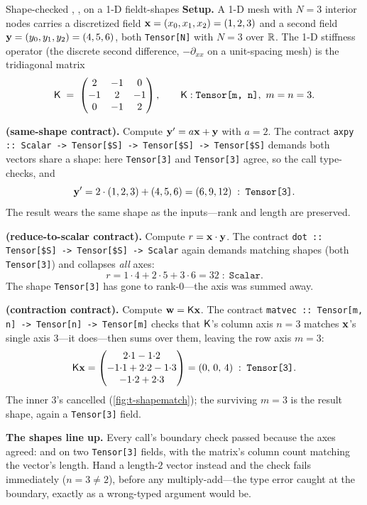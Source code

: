 \begin{workedexample}{Shape-checked , ,  on a 1-D field}{t-shapes}
\textbf{Setup.} A 1-D mesh with $N=3$ interior nodes carries a discretized field
$\mathbf{x}=(x_0,x_1,x_2)=(1,2,3)$ and a second field $\mathbf{y}=(y_0,y_1,y_2)=(4,5,6)$, both
\lstinline[style=l4style]|Tensor[N]| with $N=3$ over $\mathbb{R}$. The 1-D stiffness
operator (the discrete second difference, $-\partial_{xx}$ on a unit-spacing
mesh) is the tridiagonal matrix
\[
  \mathsf{K} \;=\;
  \begin{pmatrix} 2 & -1 & 0 \\ -1 & 2 & -1 \\ 0 & -1 & 2 \end{pmatrix},
  \qquad \mathsf{K} : \texttt{Tensor[m, n]},\ m=n=3 .
\]

\tcblower
\textbf{ (same-shape contract).} Compute $\mathbf{y}' = a\mathbf{x} + \mathbf{y}$ with
$a=2$. The contract
\lstinline[style=l4style]|axpy :: Scalar -> Tensor[$S] -> Tensor[$S] -> Tensor[$S]|
demands both vectors share a shape: here \lstinline[style=l4style]|Tensor[3]| and
\lstinline[style=l4style]|Tensor[3]| agree, so the call type-checks, and
\[
  \mathbf{y}' = 2\cdot(1,2,3) + (4,5,6) = (6,9,12) \;:\; \texttt{Tensor[3]} .
\]
The result wears the same shape as the inputs---rank and length are preserved.

\textbf{ (reduce-to-scalar contract).} Compute $r=\mathbf{x}\cdot\mathbf{y}$. The
contract \lstinline[style=l4style]|dot :: Tensor[$S] -> Tensor[$S] -> Scalar|
again demands matching shapes (both \lstinline[style=l4style]|Tensor[3]|) and
collapses \emph{all} axes:
\[
  r = 1{\cdot}4 + 2{\cdot}5 + 3{\cdot}6 = 32 \;:\; \texttt{Scalar} .
\]
The shape \lstinline[style=l4style]|Tensor[3]| has gone to rank-0---the axis was
summed away.

\textbf{ (contraction contract).} Compute $\mathbf{w} = \mathsf{K}\mathbf{x}$. The
contract \lstinline[style=l4style]|matvec :: Tensor[m, n] -> Tensor[n] -> Tensor[m]|
checks that $\mathsf{K}$'s column axis $n=3$ matches $\mathbf{x}$'s single axis $3$---it
does---then sums over them, leaving the row axis $m=3$:
\[
  \mathsf{K}\mathbf{x} =
  \begin{pmatrix} 2{\cdot}1-1{\cdot}2 \\ -1{\cdot}1+2{\cdot}2-1{\cdot}3 \\ -1{\cdot}2+2{\cdot}3 \end{pmatrix}
  = (0,\,0,\,4) \;:\; \texttt{Tensor[3]} .
\]
The inner $3$'s cancelled (\cref{fig:t-shapematch}); the surviving $m=3$ is the
result shape, again a \lstinline[style=l4style]|Tensor[3]| field.

\textbf{The shapes line up.} Every call's boundary check passed because the axes
agreed:  and  on two \lstinline[style=l4style]|Tensor[3]|
fields,  with the matrix's column count matching the vector's length.
Hand  a length-$2$ vector instead and the check fails immediately
($n=3\neq 2$), before any multiply-add---the type error caught at the boundary,
exactly as a wrong-typed argument would be.
\end{workedexample}

